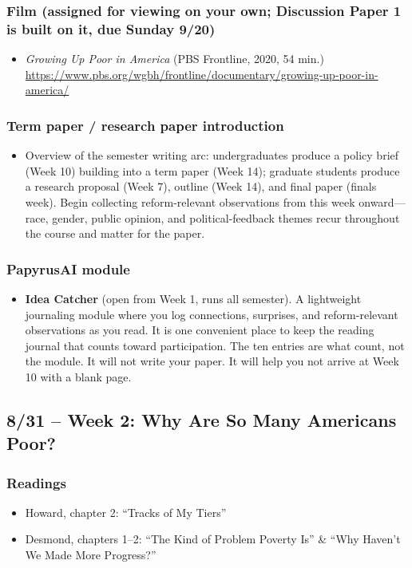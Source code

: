 \documentclass[12pt]{article}
\begin{document}
    \subsubsection*{Film (assigned for viewing on your own; Discussion Paper 1 is built on it, due Sunday 9/20)}
        \begin{itemize}
            \item \emph{Growing Up Poor in America} (PBS Frontline, 2020, 54 min.) \\
            \url{https://www.pbs.org/wgbh/frontline/documentary/growing-up-poor-in-america/}
        \end{itemize}
    \subsubsection*{Term paper / research paper introduction}
        \begin{itemize}
            \item Overview of the semester writing arc: undergraduates produce a policy brief (Week 10) building into a term paper (Week 14); graduate students produce a research proposal (Week 7), outline (Week 14), and final paper (finals week). Begin collecting reform-relevant observations from this week onward---race, gender, public opinion, and political-feedback themes recur throughout the course and matter for the paper.
        \end{itemize}
    \subsubsection*{PapyrusAI module}
        \begin{itemize}
            \item \textbf{Idea Catcher} (open from Week 1, runs all semester). A lightweight journaling module where you log connections, surprises, and reform-relevant observations as you read. It is one convenient place to keep the reading journal that counts toward participation. The ten entries are what count, not the module. It will not write your paper. It will help you not arrive at Week 10 with a blank page.
        \end{itemize}

\subsection*{8/31 -- Week 2: Why Are So Many Americans Poor?}
    \subsubsection*{Readings}
        \begin{itemize}
            \item Howard, chapter 2: ``Tracks of My Tiers''
            \item Desmond, chapters 1--2: ``The Kind of Problem Poverty Is'' \& ``Why Haven't We Made More Progress?''
        \end{itemize}
\end{document}

